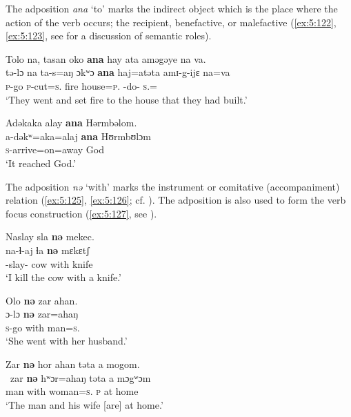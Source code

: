 The adposition \textit{ana} ‘to’ marks the indirect object which is the place where the action of the verb occurs; the recipient, benefactive, or malefactive (\ref{ex:5:122}, \ref{ex:5:123}, see  for a discussion of semantic roles).

\ea \label{ex:5:122}
Tolo  na,  tasan  oko  \textbf{ana} hay  ata  aməgəye  na  va.\\
\gll  tə-lɔ    na  ta-s=aŋ    ɔkʷɔ  \textbf{ana} haj=atəta  amɪ-g-ijɛ   na=va\\
      \textsc{p}-go  {\PSP}  \textsc{p}-cut=\textsc{s}.{\DO}  fire  {\DAT} house=\textsc{p}.{\POSS}   {\DEP}-do-{\CL}  \textsc{s}.{\DO}={\PRF}\\
\glt  ‘They went and set fire to the house that they had built.’
\z

\ea \label{ex:5:123}
Adəkaka  alay  \textbf{ana}  Hərmbəlom.\\
\gll  a-dəkʷ=aka=alaj  \textbf{ana}  Hʊrmbʊlɔm\\
      \textsc{s}-arrive=on=away  {\DAT} God\\
\glt  ‘It reached God.’
\z

The adposition \textit{nə} ‘with’ marks the instrument  or comitative (accompaniment) relation (\ref{ex:5:125}, \ref{ex:5:126}; cf. ). The adposition is also used to form the verb focus construction (\ref{ex:5:127}, see ).

\ea \label{ex:5:124}
Naslay  sla  \textbf{nə} mekec.\\
\gll  na-ɬ{}-aj  ɬa  \textbf{nə} mɛkɛtʃ\\
      {\oneS}-slay{}-{\CL}  cow  with  knife\\
\glt  ‘I kill the cow with a knife.’
\z

\ea \label{ex:5:125}
Olo  \textbf{nə}  zar  ahan.\\
\gll  ɔ{}-lɔ     \textbf{nə}   zar=ahaŋ\\
      \textsc{s}-go  with  man=\textsc{s}.{\POSS}\\
\glt  ‘She went with her husband.’
\z

\ea \label{ex:5:126}
Zar  \textbf{nə}  hor  ahan  təta  a  mogom.\\
\gll  \ zar    \textbf{nə}  hʷɔr=ahaŋ    təta  a  mɔgʷɔm\\
      man    with  woman=\textsc{s}.{\POSS}  \textsc{p}  at  home\\
\glt  ‘The man and his wife [are] at home.’ 
\z

